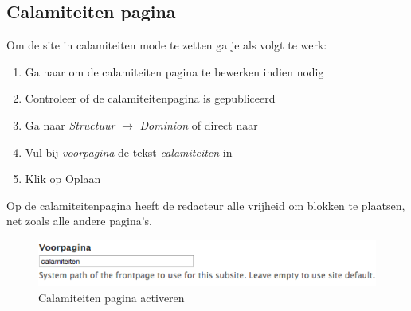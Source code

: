 
\subsection{Calamiteiten pagina}
Om de site in calamiteiten mode te zetten ga je als volgt te werk:

\begin{enumerate}
\item Ga naar  om de calamiteiten pagina te bewerken indien nodig
\item Controleer of de calamiteitenpagina is gepubliceerd
\item Ga naar \emph{Structuur} $\rightarrow$ \emph{Dominion} of direct naar 
\item Vul bij \emph{voorpagina} de tekst \emph{calamiteiten} in
\item Klik op Oplaan
\end{enumerate}

Op de calamiteitenpagina heeft de redacteur alle vrijheid om blokken te plaatsen, net zoals alle andere pagina's.

\begin{figure}[p]
\centering
\includegraphics[width=\textwidth]{img/calamiteiten.png}
\caption{Calamiteiten pagina activeren}
\label{fig:calamiteiten_image}
\end{figure}